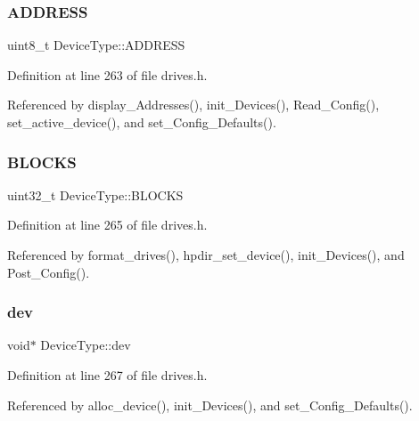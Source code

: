 \subsubsection{\texorpdfstring{A\+D\+D\+R\+E\+SS}{ADDRESS}}
{\footnotesize\ttfamily uint8\+\_\+t Device\+Type\+::\+A\+D\+D\+R\+E\+SS}



Definition at line 263 of file drives.\+h.



Referenced by display\+\_\+\+Addresses(), init\+\_\+\+Devices(), Read\+\_\+\+Config(), set\+\_\+active\+\_\+device(), and set\+\_\+\+Config\+\_\+\+Defaults().

\mbox{\label{structDeviceType_a29cbf84a3e9c8d01c8c77023ebf9c1f5}} 
\subsubsection{\texorpdfstring{B\+L\+O\+C\+KS}{BLOCKS}}
{\footnotesize\ttfamily uint32\+\_\+t Device\+Type\+::\+B\+L\+O\+C\+KS}



Definition at line 265 of file drives.\+h.



Referenced by format\+\_\+drives(), hpdir\+\_\+set\+\_\+device(), init\+\_\+\+Devices(), and Post\+\_\+\+Config().

\mbox{\label{structDeviceType_a59fc3b3cb45f8ee0cd1016bd64804d3b}} 
\subsubsection{\texorpdfstring{dev}{dev}}
{\footnotesize\ttfamily void$\ast$ Device\+Type\+::dev}



Definition at line 267 of file drives.\+h.



Referenced by alloc\+\_\+device(), init\+\_\+\+Devices(), and set\+\_\+\+Config\+\_\+\+Defaults().

\mbox{\label{structDeviceType_a47798e475b578d09f024fd983c69dfb6}} 
